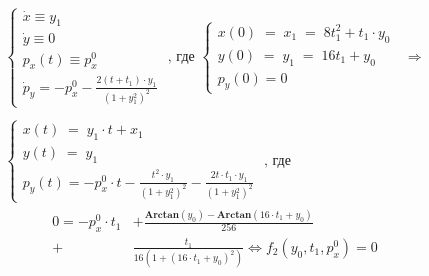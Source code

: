 \documentclass[a4paper,12pt]{article}
\begin{document}
\begin{align*}
    \left\{
        \begin{array}{l}
            \dot x \equiv y_1\\
            \dot y \equiv 0\\
            p_x(t) \equiv p_x^0\\
            \dot p_y=-p_x^0-\frac{2(t+t_1)\cdot y_1}{(1+y_1^2)^2}
        \end{array}
    \right.
    \text{ , где }
    \left\{
        \begin{array}{l}
            x(0) \;=\; x_1 \;=\; 8t_1^2+t_1\cdot y_0\\
            y(0) \;=\; y_1 \;=\; 16t_1+y_0\\
            p_y(0)=0
        \end{array}
    \right.
    \;\;\Rightarrow
    \\
    \\
    \left\{
        \begin{array}{l}
            x(t) \;=\; y_1\cdot t+ x_1\\
            y(t) \;=\; y_1 \\
            p_y(t)=- p_x^0\cdot t-\frac{t^2\cdot y_1}{(1+y_1^2)^2}-\frac{2t\cdot t_1\cdot y_1}{(1+y_1^2)^2}
        \end{array}
    \right.
    \text{ , где }
\end{align*}
\newline
\begin{align*}
    0=-p_x^0\cdot t_1&+\frac{\mathbf{Arctan}(y_0)-\mathbf{Arctan}(16\cdot t_1+y_0)}{256}
    \\
    +&\frac{t_1}{16(1+(16\cdot t_1+y_0)^2)} \Leftrightarrow f_2(y_0,t_1,p_x^0)=0
\end{align*}
\end{document}
